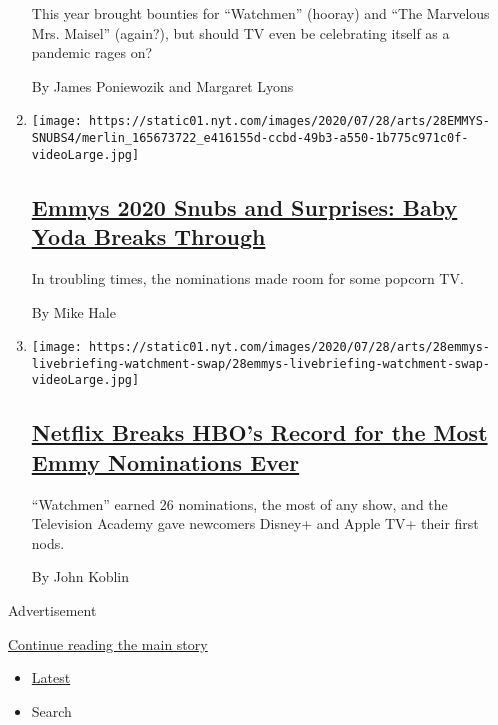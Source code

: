 \begin{enumerate}
  This year brought bounties for ``Watchmen'' (hooray) and ``The
  Marvelous Mrs. Maisel'' (again?), but should TV even be celebrating
  itself as a pandemic rages on?

  By James Poniewozik and Margaret Lyons
\item
  \texttt{[image: https://static01.nyt.com/images/2020/07/28/arts/28EMMYS-SNUBS4/merlin\_165673722\_e416155d-ccbd-49b3-a550-1b775c971c0f-videoLarge.jpg]}

  \hypertarget{emmys-2020-snubs-and-surprises-baby-yoda-breaks-through}{%
  \subsection{\texorpdfstring{\href{/2020/07/28/arts/television/emmys-snubs-mandalorian-zendaya-reese.html}{Emmys
  2020 Snubs and Surprises: Baby Yoda Breaks
  Through}}{Emmys 2020 Snubs and Surprises: Baby Yoda Breaks Through}}\label{emmys-2020-snubs-and-surprises-baby-yoda-breaks-through}}

  In troubling times, the nominations made room for some popcorn TV.

  By Mike Hale
\item
  \texttt{[image: https://static01.nyt.com/images/2020/07/28/arts/28emmys-livebriefing-watchment-swap/28emmys-livebriefing-watchment-swap-videoLarge.jpg]}

  \hypertarget{netflix-breaks-hbos-record-for-the-most-emmy-nominations-ever}{%
  \subsection{\texorpdfstring{\href{/2020/07/28/arts/television/emmy-nominations.html}{Netflix
  Breaks HBO's Record for the Most Emmy Nominations
  Ever}}{Netflix Breaks HBO's Record for the Most Emmy Nominations Ever}}\label{netflix-breaks-hbos-record-for-the-most-emmy-nominations-ever}}

  ``Watchmen'' earned 26 nominations, the most of any show, and the
  Television Academy gave newcomers Disney+ and Apple TV+ their first
  nods.

  By John Koblin
\end{enumerate}

Advertisement

\protect\hyperlink{after-mid1}{Continue reading the main story}

\begin{itemize}
\tightlist
\item
  \protect\hyperlink{stream-panel}{Latest}
\item
  Search
\end{itemize}

